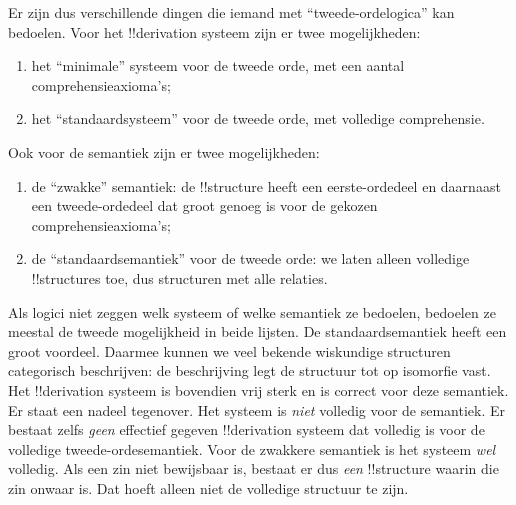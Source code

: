 \documentclass[../../../include/open-logic-section]{subfiles}
\begin{document}
Er zijn dus verschillende dingen die iemand met ``tweede-ordelogica'' kan
bedoelen. Voor het !!{derivation} systeem zijn er twee mogelijkheden:
\begin{enumerate}
\item het ``minimale'' systeem voor de tweede orde, met een aantal
  comprehensieaxioma's;
\item het ``standaardsysteem'' voor de tweede orde, met volledige
  comprehensie.
\end{enumerate}
Ook voor de semantiek zijn er twee mogelijkheden:
\begin{enumerate}
\item de ``zwakke'' semantiek: de !!{structure} heeft een eerste-ordedeel en
  daarnaast een tweede-ordedeel dat groot genoeg is voor de gekozen
  comprehensieaxioma's;
\item de ``standaardsemantiek'' voor de tweede orde: we laten alleen
  volledige !!{structure}s toe, dus structuren met alle relaties.
\end{enumerate}
Als logici niet zeggen welk systeem of welke semantiek ze bedoelen, bedoelen
ze meestal de tweede mogelijkheid in beide lijsten. De standaardsemantiek
heeft een groot voordeel. Daarmee kunnen we veel bekende wiskundige
structuren categorisch beschrijven: de beschrijving legt de structuur tot op
isomorfie vast. Het !!{derivation} systeem is bovendien vrij sterk en is
correct voor deze semantiek. Er staat een nadeel tegenover. Het systeem is
\emph{niet} volledig voor de semantiek. Er bestaat zelfs \emph{geen}
effectief gegeven !!{derivation} systeem dat volledig is voor de volledige
tweede-ordesemantiek. Voor de zwakkere semantiek is het systeem \emph{wel} volledig.
Als een zin niet bewijsbaar is, bestaat er dus \emph{een} !!{structure}
waarin die zin onwaar is. Dat hoeft alleen niet de volledige structuur te
zijn.
\end{document}
